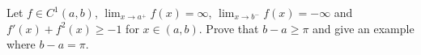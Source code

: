 Let \(f\in C^1(a,b)\), \(\lim_{x\to a^+}f(x)=\infty\), \(\lim_{x\to b^-}f(x)=-\infty\) and \(f'(x)+f^2(x)\geq -1\) for \(x\in (a,b)\). Prove that \(b-a\geq\pi\) and give an example where \(b-a=\pi\).
